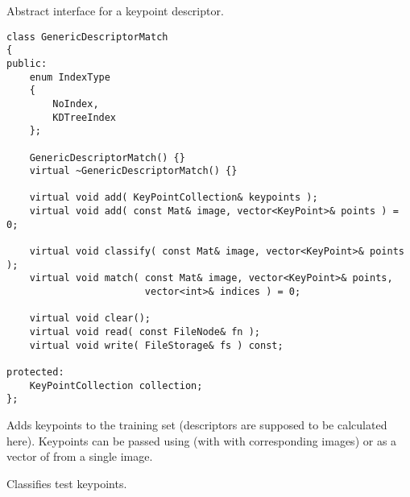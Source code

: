 Abstract interface for a keypoint descriptor.

\begin{lstlisting}
class GenericDescriptorMatch
{
public:
    enum IndexType
    {
        NoIndex,
        KDTreeIndex
    };

    GenericDescriptorMatch() {}
    virtual ~GenericDescriptorMatch() {}

    virtual void add( KeyPointCollection& keypoints );
    virtual void add( const Mat& image, vector<KeyPoint>& points ) = 0;

    virtual void classify( const Mat& image, vector<KeyPoint>& points );
    virtual void match( const Mat& image, vector<KeyPoint>& points,
                        vector<int>& indices ) = 0;
    
    virtual void clear();
    virtual void read( const FileNode& fn );
    virtual void write( FileStorage& fs ) const;
    
protected:
    KeyPointCollection collection;
};

\end{lstlisting}
Adds keypoints to the training set (descriptors are supposed to be calculated here).
Keypoints can be passed using  (with with corresponding images) or as a vector of  from a single image.


\begin{description}
\end{description}



\begin{description}
\end{description}

Classifies test keypoints.


\begin{description}
\end{description}

